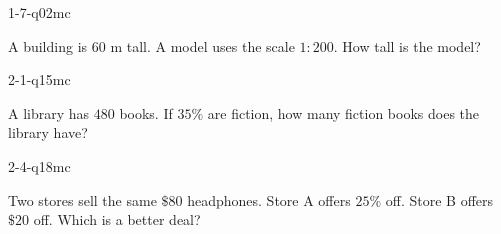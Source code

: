 \begin{practiceQuestion}{1-7-q02}{mc}
\begin{questionText}
A building is $60$ m tall. A model uses the scale $1 : 200$. How tall is the model?
\end{questionText}
\end{practiceQuestion}

\begin{practiceQuestion}{2-1-q15}{mc}
\begin{questionText}
A library has $480$ books. If $35\%$ are fiction, how many fiction books does the library have?
\end{questionText}
\end{practiceQuestion}

\begin{practiceQuestion}{2-4-q18}{mc}
\begin{questionText}
Two stores sell the same $\$80$ headphones. Store A offers $25\%$ off. Store B offers $\$20$ off. Which is a better deal?
\end{questionText}
\end{practiceQuestion}

